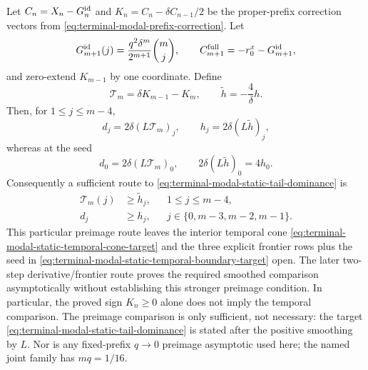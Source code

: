 \begin{lemma}
\label{lem:terminal-modal-static-temporal-cone}
Let $C_n=X_n-G_n^{\rm id}$ and
$K_n=C_n-\delta C_{n-1}/2$ be the proper-prefix correction vectors from
\cref{eq:terminal-modal-prefix-correction}.  Let
\[
 G_{m+1}^{\rm id}(j)=\frac{q^2\delta^m}{2^{m+1}}\binom mj,
 \qquad
 C_{m+1}^{\rm full}=-r_0^x-G_{m+1}^{\rm id},
\]
and zero-extend $K_{m-1}$ by one coordinate.  Define
\begin{equation}
 \mathcal T_m=\delta K_{m-1}-K_m,\qquad
 \widetilde h=-\frac4\delta h.
 \label{eq:terminal-modal-static-temporal-cone-data}
\end{equation}
Then, for $1\le j\le m-4$,
\begin{equation}
 d_j=2\delta(L\mathcal T_m)_j,\qquad
 h_j=2\delta(L\widetilde h)_j,
 \label{eq:terminal-modal-static-temporal-cone-interior}
\end{equation}
whereas at the seed
\begin{equation}
 d_0=2\delta(L\mathcal T_m)_0,\qquad
 2\delta(L\widetilde h)_0=4h_0.
 \label{eq:terminal-modal-static-temporal-cone-seed}
\end{equation}
Consequently a sufficient route to
\eqref{eq:terminal-modal-static-tail-dominance} is
\begin{align}
 \mathcal T_m(j)&\ge\widetilde h_j,
 &&1\le j\le m-4,
 \label{eq:terminal-modal-static-temporal-cone-target}\\
 d_j&\ge h_j,
 &&j\in\{0,m-3,m-2,m-1\}.
 \label{eq:terminal-modal-static-temporal-boundary-target}
\end{align}
This particular preimage route leaves the interior temporal cone
\eqref{eq:terminal-modal-static-temporal-cone-target} and the three explicit
frontier rows plus the seed in
\eqref{eq:terminal-modal-static-temporal-boundary-target} open.  The later
two-step derivative/frontier route proves the required smoothed comparison
asymptotically without establishing this stronger preimage condition.
In particular, the proved sign $K_n\ge0$ alone does not imply the temporal
comparison.  The preimage comparison is only sufficient, not necessary:
the target \eqref{eq:terminal-modal-static-tail-dominance} is stated after
the positive smoothing by $L$.  Nor is any fixed-prefix $q\to0$ preimage
asymptotic used here; the named joint family has $mq=1/16$.
\end{lemma}

